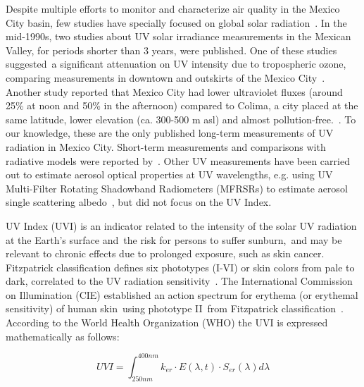 \documentclass{article}
\begin{document}
Despite multiple efforts to monitor and characterize air quality in the
Mexico City basin, few studies have specially focused on global solar
radiation~\cite{valdes1991,Qui_ones_2014,Matsumoto_2014}. In the mid-1990s, two studies about UV solar irradiance measurements in the Mexican Valley, for periods shorter
than 3 years, were published. One of these studies suggested~a
significant attenuation on UV intensity due to tropospheric ozone,
comparing measurements in downtown and outskirts of the Mexico
City~\cite{Acosta_2000}. Another study reported that Mexico City had
lower ultraviolet fluxes (around 25\% at noon and 50\% in the afternoon)
compared to Colima, a city placed at the same latitude, lower elevation
(ca. 300-500 m asl) and almost pollution-free.~\cite{Galindo_1995}. To
our knowledge, these are the only published long-term measurements of UV
radiation in Mexico City. Short-term measurements and comparisons with
radiative models were reported by~\cite{Palancar_2012}. Other UV
measurements have been carried out to estimate aerosol optical
properties at UV wavelengths, e.g. using UV Multi-Filter Rotating
Shadowband Radiometers (MFRSRs) to estimate aerosol single scattering
albedo~\cite{Goering_2005,Corr_2009}, but did not focus on the UV Index.

UV Index (UVI) is an indicator related to the intensity of the solar UV
radiation at the Earth's surface and~the risk for persons to suffer
sunburn,~and may be relevant to chronic effects due to prolonged
exposure, such as skin cancer. Fitzpatrick classification defines six
phototypes (I-VI) or skin colors from pale to dark, correlated to the UV
radiation sensitivity~\cite{kukita1974}. The International Commission
on Illumination (CIE) established an action spectrum for erythema (or
erythemal sensitivity) of human skin~using phototype II~from Fitzpatrick
classification~\cite{organization2014}. According to the World Health
Organization (WHO) the UVI is expressed mathematically as follows:

\begin{equation}
UVI=\int_{250nm}^{400nm}k_{er}\cdot E(\lambda,t)\cdot S_{er}\left(\lambda\right)d\lambda
\end{equation}
\end{document}
